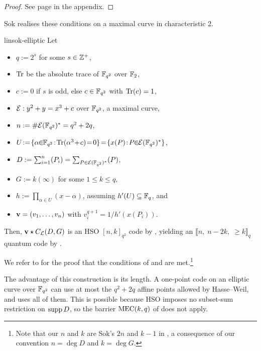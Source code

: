\documentclass[twocolumn, 11pt]{scrartcl}
\begin{document}
{\begin{proof}
    See page \pageref{proof:hso-criterion} in the appendix.
\end{proof}

Sok realises these conditions on a maximal curve in characteristic 2.

\begin{construction}{\cite[Constr.~5 \& Thm.~6]{sok2021new}}{linsok-elliptic}
    Let
    \begin{itemize}
        \item $q:=2^s$ for some $s\in\mathbb{Z}^+$,
        \item $\operatorname{Tr}$ be the absolute trace of $\mathbb{F}_{q^2}$ over $\mathbb{F}_2$,
        \item $c:=0$ if $s$ is odd, else $c\in\mathbb{F}_{q^2}$ with $\operatorname{Tr}(c)=1$,
        \item $\mathcal{E}:y^2+y=x^3+c$ over $\mathbb{F}_{q^2}$, a maximal curve,
        \item $n:=\#\mathcal{E}(\mathbb{F}_{q^2})^*=q^2+2q$,
        \item $U\!:=\!\set{\alpha\!\!\in\!\!\bbF_{q^2}\!:\!\Trace(\alpha^3\!+\!c)\!=\!0}\!=\!\set{x(P)\!:\!P\!\!\in\!\!\mcE(\bbF_{q^2})^*}$,
        \item $D:=\sum_{i=1}^{n}(P_i)=\sum_{P\in\mathcal{E}(\mathbb{F}_{q^2})^*} (P)$,
        \item $G:=k(\infty)$ for some $1\leq k\leq q$,
        \item $h:=\prod_{\alpha\in U}(x-\alpha)$, assuming $h'(U)\subseteq\mathbb{F}_q$, and
        \item $\mathbf{v}=(v_1,\hdots,v_n)$ with $v_i^{q+1}=1/h'(x(P_i))$.
    \end{itemize}
    
    \bigskip
    Then, $\mathbf{v}\star C_\mathcal{L}(D,G)$ is an HSO $[n,k]_{q^2}$ code by , yielding an $\llbracket n,\;n-2k,\;\geq k\rrbracket_q$ quantum code by .
\end{construction}

We refer to \cite[Constr.~5 \& Thm.~6]{sok2021new} for the proof that the conditions of  and  are met.\footnote{Note that our $n$ and $k$ are Sok's $2n$ and $k-1$ in \cite{sok2021new}, a consequence of our convention $n=\deg D$ and $k=\deg G$.}

The advantage of this construction is its length. A one-point code on an elliptic curve over $\mathbb{F}_{q^2}$ can use at most the $q^2+2q$ affine points allowed by Hasse--Weil, and  uses all of them. This is possible because HSO imposes no subset-sum restriction on $\operatorname{supp} D$, so the barrier $\operatorname{MEC}(k,q)$ of  does not apply.

}
\end{document}
